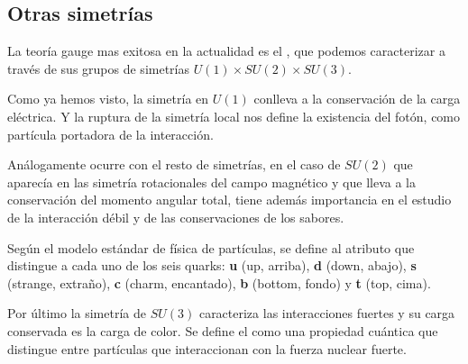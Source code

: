 \subsection{Otras simetrías}\label{subsec:otras-simetrías}
La teoría gauge mas exitosa en la actualidad es el , que podemos caracterizar a través de sus grupos de simetrías $U(1)\times SU(2)\times SU(3)$.

Como ya hemos visto, la simetría en $U(1)$ conlleva a la conservación de la carga eléctrica. Y la ruptura de la simetría local nos define la existencia del fotón, como partícula portadora de la interacción.

Análogamente ocurre con el resto de simetrías, en el caso de $SU(2)$ que aparecía en las simetría rotacionales del campo magnético y que lleva a la conservación del momento angular total, tiene además importancia en el estudio de la interacción débil y de las conservaciones de los sabores\autocite[107]{ISMPP}.

Según el modelo estándar de física de partículas, se define  al atributo que distingue a cada uno de los seis quarks: \textbf{u} (up, arriba), \textbf{d} (down, abajo), \textbf{s} (strange, extraño), \textbf{c} (charm, encantado), \textbf{b} (bottom, fondo) y \textbf{t} (top, cima).

Por último la simetría de $SU(3)$ caracteriza las interacciones fuertes y su carga conservada es la carga de color. Se define el  como una propiedad cuántica que distingue entre partículas que interaccionan con la fuerza nuclear fuerte.

